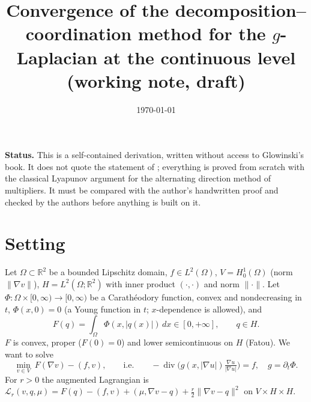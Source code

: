 \documentclass[11pt]{amsart}
\title[Convergence of the decomposition--coordination method]{Convergence of the decomposition--coordination method for the $g$-Laplacian at the continuous level\\ {\large (working note, draft)}}
\author{}
\date{\today}
\theoremstyle{remark}
\theoremstyle{definition}
\newcommand{\dx}{\,dx}
\newcommand{\R}{\mathbb R}
\begin{document}
\maketitle

\noindent\textbf{Status.} This is a self-contained derivation, written without access to Glowinski's book. It does not quote the statement of \cite[Ch.~VI, Thm.~5.1]{Glowinski}; everything is proved from scratch with the classical Lyapunov argument for the alternating direction method of multipliers. It must be compared with the author's handwritten proof and checked by the authors before anything is built on it.

\section{Setting}
Let $\Omega\subset\R^2$ be a bounded Lipschitz domain, $f\in L^2(\Omega)$, $V=H^1_0(\Omega)$ (norm $\|\nabla v\|$), $H=L^2(\Omega;\R^2)$ with inner product $(\cdot,\cdot)$ and norm $\|\cdot\|$. Let $\Phi\colon\Omega\times[0,\infty)\to[0,\infty)$ be a Carath\'eodory function, convex and nondecreasing in $t$, $\Phi(x,0)=0$ (a Young function in $t$; $x$-dependence is allowed), and
\[
F(q)=\int_\Omega\Phi(x,|q(x)|)\dx\in[0,+\infty],\qquad q\in H .
\]
$F$ is convex, proper ($F(0)=0$) and lower semicontinuous on $H$ (Fatou). We want to solve
\begin{equation}\label{P}
\min_{v\in V}\ F(\nabla v)-(f,v),\qquad\text{i.e.}\qquad -\operatorname{div}\Big(g(x,|\nabla u|)\tfrac{\nabla u}{|\nabla u|}\Big)=f,\quad g=\partial_t\Phi .
\end{equation}
For $r>0$ the augmented Lagrangian is $\mathcal L_r(v,q,\mu)=F(q)-(f,v)+(\mu,\nabla v-q)+\frac r2\|\nabla v-q\|^2$ on $V\times H\times H$.
\end{document}
